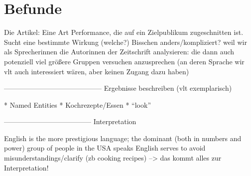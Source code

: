 \section{Befunde}


Die Artikel: Eine Art Performance, die auf ein Zielpublikum zugeschnitten ist.
Sucht eine bestimmte Wirkung (welche?)
Bisschen anders/kompliziert? weil wir als Sprecherinnen die Autorinnen der Zeitschrift analysieren: die dann auch potenziell viel größere Gruppen versuchen anzusprechen (an deren Sprache wir vlt auch interessiert wären, aber keinen Zugang dazu haben)

------------------------------------------
Ergebnisse beschreiben
(vlt exemplarisch)

* Named Entities
* Kochrezepte/Essen
* ``look''



--------------------------------------
Interpretation

English is the more prestigious language;
the dominant (both in numbers and power) group of people in the USA speaks English
serves to avoid misunderstandings/clarify (zb cooking recipes)
--> das kommt alles zur Interpretation!


